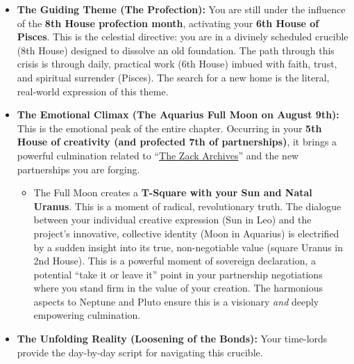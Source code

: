 \documentclass{article}
\begin{document}
\begin{itemize}
\item
  \textbf{The Guiding Theme (The Profection):} You are still under the influence of the \textbf{8th House profection month}, activating your \textbf{6th House of Pisces}. This is the celestial directive: you are in a divinely scheduled crucible (8th House) designed to dissolve an old foundation. The path through this crisis is through daily, practical work (6th House) imbued with faith, trust, and spiritual surrender (Pisces). The search for a new home is the literal, real-world expression of this theme.
\item
  \textbf{The Emotional Climax (The Aquarius Full Moon on August 9th):} This is the emotional peak of the entire chapter. Occurring in your \textbf{5th House of creativity (and profected 7th of partnerships)}, it brings a powerful culmination related to ``\hyperlink{gloss:the_zack_archives}{The Zack Archives}'' and the new partnerships you are forging.

  \begin{itemize}
  \tightlist
  \item
    The Full Moon creates a \textbf{T-Square with your Sun and Natal Uranus}. This is a moment of radical, revolutionary truth. The dialogue between your individual creative expression (Sun in Leo) and the project's innovative, collective identity (Moon in Aquarius) is electrified by a sudden insight into its true, non-negotiable value (square Uranus in 2nd House). This is a powerful moment of sovereign declaration, a potential ``take it or leave it'' point in your partnership negotiations where you stand firm in the value of your creation. The harmonious aspects to Neptune and Pluto ensure this is a visionary \emph{and} deeply empowering culmination.
  \end{itemize}
\item
  \textbf{The Unfolding Reality (Loosening of the Bonds):} Your time-lords provide the day-by-day script for navigating this crucible.


\end{itemize}
\end{document}
